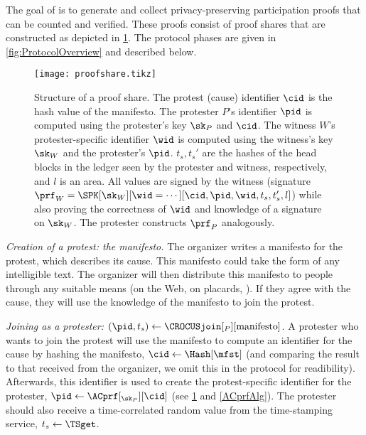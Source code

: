 The goal of \CROCUS is to generate and collect privacy-preserving
participation proofs that can be counted and verified. These proofs
consist of proof shares that are constructed as depicted in
\cref{fig:ProofFig}. The protocol phases are given in
\cref{fig:ProtocolOverview} and described below.

\begin{figure}
  \centering
  \small
  \texttt{[image: proofshare.tikz]}
  \caption{%
    Structure of a proof share.
    The protest (cause) identifier \(\cid\) is the hash value of the manifesto.
    The protester \(P\)'s identifier \(\pid\) is computed using the protester's key \(\sk_P\) and \(\cid\).
    The witness \(W\)'s protester-specific identifier \(\wid\) is computed using the
    witness's key \(\sk_W\) and the protester's \(\pid\).
    \(t_s, t_s'\) are the hashes of the head blocks in the ledger seen by the 
    protester and witness, respectively, and \(l\) is an area.
    All values are signed by the witness (signature \(\prf_W = \SPK[\sk_W][\wid 
      = \dotsb][\cid, \pid, \wid, t_s, t_s', l]\)) while also proving the 
    correctness of \(\wid\) and knowledge of a signature on \(\sk_W\).
    The protester constructs \(\prf_P\) analogously.
  }%
  \label{fig:ProofFig}
\end{figure}%


\emph{Creation of a protest: the manifesto.}
The organizer writes a manifesto for the protest, which describes its cause.
This manifesto could take the form of any intelligible text.
The organizer will then distribute this manifesto to people through
any suitable means  (\eg on the Web, on placards, \etc).
If they agree with the cause, they will use the knowledge of the
manifesto to join the protest. 


\emph{Joining as a protester: \((\pid, t_s)\gets 
    \CROCUSjoin[_P][\text{manifesto}]\).}
A protester who wants to join the protest will use the manifesto to
compute an identifier for the cause by hashing the manifesto,
\(\cid\gets \Hash[\mfst]\) (and comparing the result to that received
from the organizer, we omit this in the protocol for readibility).
Afterwards, this identifier is used to create the protest-specific identifier 
for the protester, \(\pid\gets \ACprf[_{\sk_P}][\cid]\) (see 
\cref{fig:ProofFig} and \cref{ACprfAlg}).
The protester should also receive a time-correlated random value from the 
time-stamping service, \(t_s\gets \TSget\).


